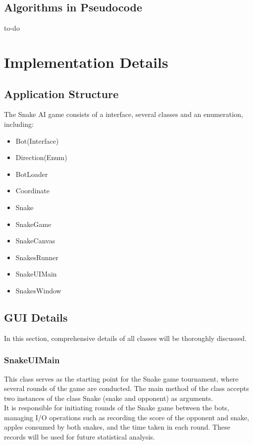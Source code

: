 \documentclass[a4paper,12pt]{article}
\begin{document}
\subsection{Algorithms in Pseudocode}
to-do

\section{Implementation Details}
\subsection{Application Structure}
The Snake AI game consists of a interface, several classes and an enumeration, including: 
\begin{itemize}
\item Bot(Interface)
\item Direction(Enum)
\item BotLoader
\item Coordinate
\item Snake
\item SnakeGame
\item SnakeCanvas
\item SnakesRunner
\item SnakeUIMain
\item SnakesWindow
\end{itemize}

\subsection{GUI Details}
In this section, comprehensive details of all classes will be thoroughly discussed.
\subsubsection{SnakeUIMain}
This class serves as the starting point for the Snake game tournament, where several rounds of the game are conducted.
The main method of the class accepts two instances of the class Snake (snake and opponent) as arguments.\\
It is responsible for initiating rounds of the Snake game between the bots, managing I/O operations such as recording the score of the opponent and snake,
apples consumed by both snakes, and the time taken in each round. These records will be used for future statistical analysis.
\end{document}
